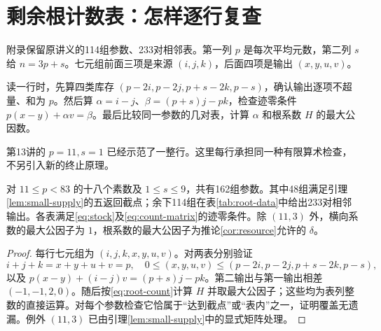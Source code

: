 \chapter{剩余根计数表：怎样逐行复查}\label{app:certificates}
附录保留原讲义的114组参数、233对相邻表。第一列 $p$ 是每次平均元数，第二列 $s$ 给 $n=3p+s$。七元组前面三项是来源 $(i,j,k)$，后面四项是输出 $(x,y,u,v)$。

读一行时，先算四类库存 $(p-2i,p-2j,p+s-2k,p-s)$，确认输出逐项不超量、和为 $p$。然后算 $\alpha=i-j$、$\beta=(p+s)j-pk$，检查迹零条件 $p(x-y)+\alpha v=\beta$。最后比较同一参数的几对表，计算 $\alpha$ 和根系数 $H$ 的最大公因数。

第13讲的 $p=11,s=1$ 已经示范了一整行。这里每行承担同一种有限算术检查，不另引入新的终止原理。
\begin{proposition}[根计数证书]\label{prop:root-certificate}
对 $11\le p<83$ 的十八个素数及 $1\le s\le9$，共有162组参数。其中48组满足引理\ref{lem:small-supply}的五返回截点；余下114组在表\ref{tab:root-data}中给出233对相邻输出。各表满足\eqref{eq:stock}及\eqref{eq:count-matrix}的迹零条件。除 $(11,3)$ 外，横向系数的最大公因子为 $1$，根系数的最大公因子为推论\ref{cor:resource}允许的 $\delta$。
\end{proposition}
\begin{proof}
每行七元组为 $(i,j,k,x,y,u,v)$。对两表分别验证
\[
i+j+k=x+y+u+v=p,\quad
0\le(x,y,u,v)\le(p-2i,p-2j,p+s-2k,p-s),
\]
以及 $p(x-y)+(i-j)v=(p+s)j-pk$。第二输出与第一输出相差 $(-1,-1,2,0)$。随后按\eqref{eq:root-count}计算 $H$ 并取最大公因子；这些均为表列整数的直接运算。对每个参数检查它恰属于“达到截点”或“表内”之一，证明覆盖无遗漏。例外 $(11,3)$ 已由引理\ref{lem:small-supply}中的显式矩阵处理。
\end{proof}
\begingroup\small
